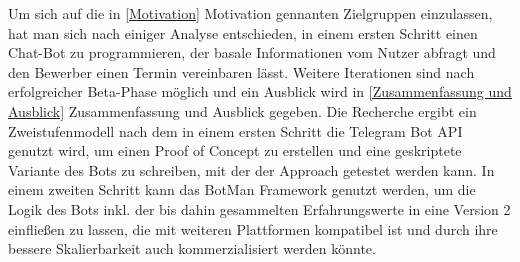 Um sich auf die in \ref{Motivation} Motivation gennanten Zielgruppen einzulassen, hat man sich nach einiger Analyse entschieden, in einem ersten Schritt einen Chat-Bot zu programmieren, der basale Informationen vom Nutzer abfragt und den Bewerber einen Termin vereinbaren lässt. Weitere Iterationen sind nach erfolgreicher Beta-Phase möglich und ein Ausblick wird in \ref{Zusammenfassung und Ausblick} Zusammenfassung und Ausblick gegeben. Die Recherche ergibt ein Zweistufenmodell nach dem in einem ersten Schritt die Telegram Bot API genutzt wird, um einen Proof of Concept zu erstellen und eine geskriptete Variante des Bots zu schreiben, mit der der Approach getestet werden kann. In einem zweiten Schritt kann das BotMan Framework genutzt werden, um die Logik des Bots inkl. der bis dahin gesammelten Erfahrungswerte in eine Version 2 einfließen zu lassen, die mit weiteren Plattformen kompatibel ist und durch ihre bessere Skalierbarkeit auch kommerzialisiert werden könnte. \\
